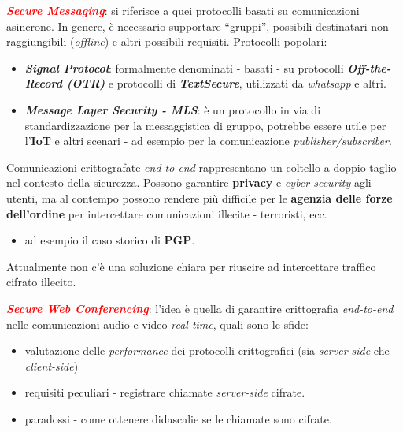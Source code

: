 \begin{flushleft}
    \textcolor{red}{\textbf{\textit{Secure Messaging}}}: si riferisce a quei protocolli basati su comunicazioni asincrone. In genere, è necessario supportare ``gruppi'', possibili destinatari non raggiungibili (\textit{offline}) e altri possibili requisiti. Protocolli popolari:
    \begin{itemize}[nosep]
        \item \textbf{\textit{Signal Protocol}}: formalmente denominati - basati - su protocolli \textbf{\textit{Off-the-Record (OTR)}} e protocolli di \textbf{\textit{TextSecure}}, utilizzati da \textit{whatsapp} e altri.
        \item \textbf{\textit{Message Layer Security - MLS}}: è un protocollo in via di standardizzazione per la messaggistica di gruppo, potrebbe essere utile per l'\textbf{IoT} e altri scenari - ad esempio per la comunicazione \textit{publisher/subscriber}.
    \end{itemize}

    Comunicazioni crittografate \textit{end-to-end} rappresentano un coltello a doppio taglio nel contesto della sicurezza. Possono garantire \textbf{\textbf{privacy}} e \textit{cyber-security} agli utenti, ma al contempo possono rendere più difficile per le \textbf{agenzia delle forze dell'ordine} per intercettare comunicazioni illecite - terroristi, ecc.
    \begin{itemize}[nosep]
        \item ad esempio il caso storico di \textbf{PGP}.
    \end{itemize}
    Attualmente non c'è una soluzione chiara per riuscire ad intercettare traffico cifrato illecito.

    \medskip

    \textcolor{red}{\textbf{\textit{Secure Web Conferencing}}}: l'idea è quella di garantire crittografia \textit{end-to-end} nelle comunicazioni audio e video \textit{real-time}, quali sono le sfide:
    \begin{itemize}[nosep]
        \item valutazione delle \textit{performance} dei protocolli crittografici (sia \textit{server-side} che \textit{client-side})
        \item requisiti peculiari - registrare chiamate \textit{server-side} cifrate.
        \item paradossi - come ottenere didascalie se le chiamate sono cifrate.
    \end{itemize}

\end{flushleft}

